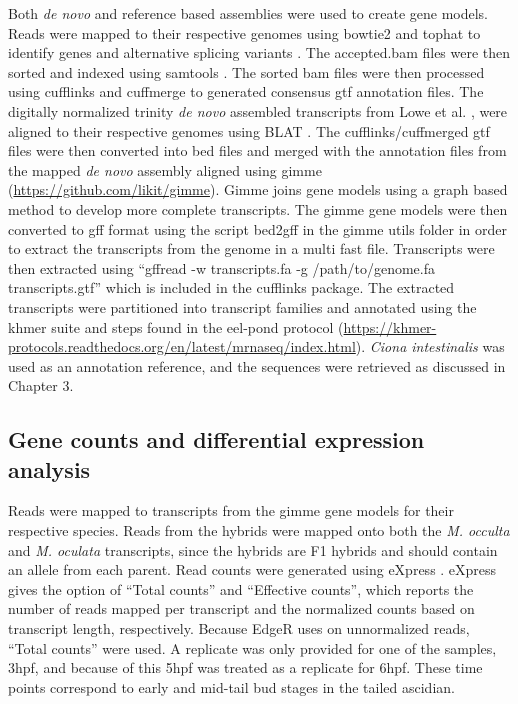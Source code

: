 Both \textit{de novo} and reference based assemblies were used to create gene models. Reads were mapped to their respective genomes using bowtie2 and tophat to identify genes and alternative splicing variants \cite{langmead_fast_2012,trapnell_differential_2012}. The accepted.bam files were then sorted and indexed using samtools \cite{li_sequence_2009}. The sorted bam files were then processed using cufflinks and cuffmerge to generated consensus gtf annotation files. The digitally normalized trinity \textit{de novo} assembled transcripts from Lowe et al. \cite{lowe_evaluating_2014}, were aligned to their respective genomes using BLAT \cite{haas_novo_2013}. The cufflinks/cuffmerged gtf files were then converted into bed files and merged with the annotation files from the mapped \textit{de novo} assembly aligned using gimme (\url{https://github.com/likit/gimme}). Gimme joins gene models using a graph based method to develop more complete transcripts. The gimme gene models were then converted to gff format using the script bed2gff in the gimme utils folder in order to extract the transcripts from the genome in a multi fast file. Transcripts were then extracted using ``gffread -w transcripts.fa -g /path/to/genome.fa transcripts.gtf'' which is included in the cufflinks package. The extracted transcripts were partitioned into transcript families and annotated using the khmer suite and steps found in the eel-pond protocol (\url{https://khmer-protocols.readthedocs.org/en/latest/mrnaseq/index.html}). \textit{Ciona intestinalis} was used as an annotation reference, and the sequences were retrieved as discussed in Chapter 3. 

\subsection{Gene counts and differential expression analysis}
Reads were mapped to transcripts from the gimme gene models for their respective species. Reads from the hybrids were mapped onto both the \textit{M. occulta} and \textit{M. oculata} transcripts, since the hybrids are F1 hybrids and should contain an allele from each parent. Read counts were generated using eXpress \cite{roberts_streaming_2013}. eXpress gives the option of ``Total counts'' and ``Effective counts'', which reports the number of reads mapped per transcript and the normalized counts based on transcript length, respectively. Because EdgeR uses on unnormalized reads, ``Total counts'' were used. A replicate was only provided for one of the samples, 3hpf, and because of this 5hpf was treated as a replicate for 6hpf. These time points correspond to early and mid-tail bud stages in the tailed ascidian. 

